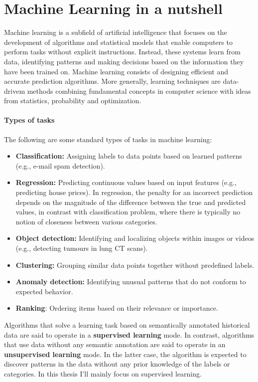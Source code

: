 \chapter{Machine Learning in a nutshell} 

Machine learning is a subfield of artificial intelligence that focuses on the development of algorithms and statistical models that enable computers to perform tasks without explicit instructions. Instead, these systems learn from data, identifying patterns and making decisions based on the information they have been trained on.
Machine learning consists of designing efficient and accurate prediction algorithms. More generally, learning techniques are data-drivem methods combining fundamental concepts in computer science with ideas from statistics, probability and optimization.
\subsubsection{Types of tasks}
The following are some standard types of tasks in machine learning:
\begin{itemize}
    \item \textbf{Classification:} Assigning labels to data points based on learned patterns (e.g., e-mail spam detection).
    \item \textbf{Regression:} Predicting continuous values based on input features (e.g., predicting house prices). In regression, the penalty for an incorrect prediction depends on the magnitude of the difference between the true and predicted values, in contrast with classification problem, where there is typically no notion of closeness between various categories. 
    \item \textbf{Object detection:} Identifying and localizing objects within images or videos (e.g., detecting tumours in lung CT scans).
    \item \textbf{Clustering:} Grouping similar data points together without predefined labels.
    \item \textbf{Anomaly detection:} Identifying unusual patterns that do not conform to expected behavior.
    \item \textbf{Ranking}: Ordering items based on their relevance or importance.
\end{itemize}

Algorithms that solve a learning task based on semantically annotated historical data are said to operate in a \textbf{supervised learning} mode. In contrast, algorithms that use data without any semantic annotation are said to operate in an \textbf{unsupervised learning} mode. In the latter case, the algorithm is expected to discover patterns in the data without any prior knowledge of the labels or categories.
In this thesis I'll mainly focus on supervised learning. 

